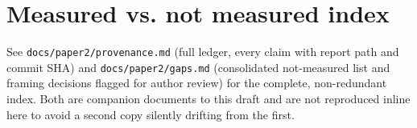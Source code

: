 \documentclass[11pt]{article}
\begin{document}
\section{Measured vs. not measured index}
\label{app:measured}
See \texttt{docs/paper2/provenance.md} (full ledger, every claim with report path and commit SHA)
and \texttt{docs/paper2/gaps.md} (consolidated not-measured list and framing decisions flagged for
author review) for the complete, non-redundant index. Both are companion documents to this draft
and are not reproduced inline here to avoid a second copy silently drifting from the first.



\end{document}
